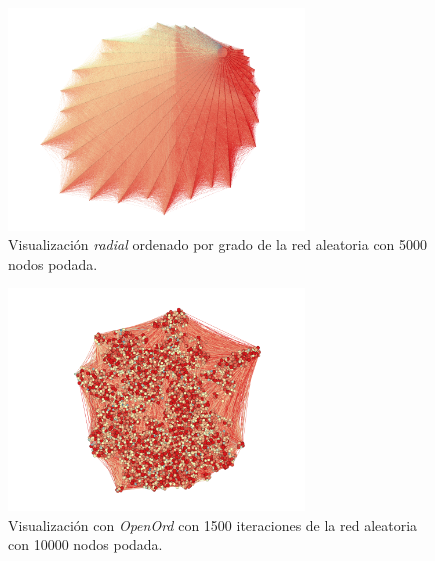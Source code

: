 \documentclass[10pt,a4paper,spanish]{article}
\numberwithin{equation}{section} %
\numberwithin{figure}{section} %
\numberwithin{table}{section} %
\begin{document}
\begin{figure}[!h]
  \centering
  \includegraphics[width=0.7\textwidth]{../visualizacion/5000radial}
  \caption{Visualización \textit{radial} ordenado por grado de la red aleatoria con 5000 nodos podada.}
  \label{radial5000}
\end{figure}

\begin{figure}[!h]
  \centering
  \includegraphics[width=0.7\textwidth]{../visualizacion/10000openord}
  \caption{Visualización con \textit{OpenOrd} con 1500 iteraciones de la red aleatoria con 10000 nodos podada.}
  \label{oo1000}
\end{figure}
\end{document}
